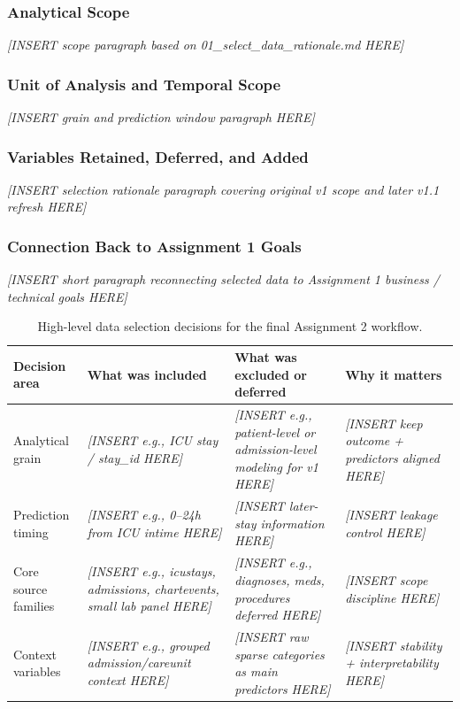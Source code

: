 \documentclass[12pt]{article}
\newcommand{\placeholder}[1]{\textit{[INSERT #1 HERE]}}
\begin{document}
\subsubsection*{Analytical Scope}
\placeholder{scope paragraph based on 01\_select\_data\_rationale.md}

\subsubsection*{Unit of Analysis and Temporal Scope}
\placeholder{grain and prediction window paragraph}

\subsubsection*{Variables Retained, Deferred, and Added}
\placeholder{selection rationale paragraph covering original v1 scope and later v1.1 refresh}

\subsubsection*{Connection Back to Assignment 1 Goals}
\placeholder{short paragraph reconnecting selected data to Assignment 1 business / technical goals}

\begin{table}[H]
\centering
\small
\caption{High-level data selection decisions for the final Assignment 2 workflow.}
\label{tab:data_selection_summary}
\begin{tabular}{@{}L{3.1cm}L{4.4cm}L{4.8cm}L{2.4cm}@{}}
\toprule
\textbf{Decision area} & \textbf{What was included} & \textbf{What was excluded or deferred} & \textbf{Why it matters} \\
\midrule
Analytical grain & \placeholder{e.g., ICU stay / stay\_id} & \placeholder{e.g., patient-level or admission-level modeling for v1} & \placeholder{keep outcome + predictors aligned} \\
Prediction timing & \placeholder{e.g., 0--24h from ICU intime} & \placeholder{later-stay information} & \placeholder{leakage control} \\
Core source families & \placeholder{e.g., icustays, admissions, chartevents, small lab panel} & \placeholder{e.g., diagnoses, meds, procedures deferred} & \placeholder{scope discipline} \\
Context variables & \placeholder{e.g., grouped admission/careunit context} & \placeholder{raw sparse categories as main predictors} & \placeholder{stability + interpretability} \\
\bottomrule
\end{tabular}
\end{table}
\end{document}

